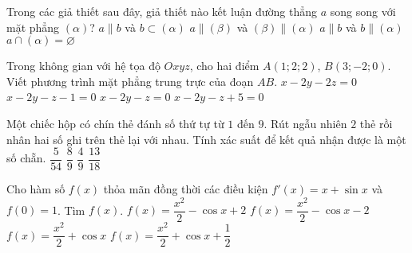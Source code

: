 \begin{ex}%
Trong các giả thiết sau đây, giả thiết nào kết luận đường thẳng $a$ song song với mặt phẳng $(\alpha)$?
\choice
{$a\parallel b$ và $b\subset (\alpha)$}
{$a\parallel (\beta)$ và $(\beta)\parallel (\alpha)$}
{$a\parallel b$ và $b\parallel (\alpha)$}
{\True $a\cap (\alpha)=\varnothing$}
\end{ex}

\begin{ex}%
Trong không gian với hệ tọa độ $Oxyz$, cho hai điểm $A(1;2;2)$, $B(3;-2;0)$. Viết phương trình mặt phẳng trung trực của đoạn $AB$.
\choice
{$x-2y-2z=0$}
{\True $x-2y-z-1=0$}
{$x-2y-z=0$}
{$x-2y-z+5=0$}
\end{ex}

\begin{ex}%
Một chiếc hộp có chín thẻ đánh số thứ tự từ $1$ đến $9$. Rút ngẫu nhiên $2$ thẻ rồi nhân hai số ghi trên thẻ lại với nhau. Tính xác suất để kết quả nhận được là một số chẵn.
\choice
{$\dfrac{5}{54}$}
{$\dfrac{8}{9}$}
{$\dfrac{4}{9}$}
{\True $\dfrac{13}{18}$}
\end{ex}

\begin{ex}%
Cho hàm số $f(x)$ thỏa mãn đồng thời các điều kiện $f'(x)=x+\sin x$ và $f(0)=1$. Tìm $f(x)$.
\choice
{\True $f(x)=\dfrac{x^2}{2}-\cos x+2$}
{$f(x)=\dfrac{x^2}{2}-\cos x-2$}
{$f(x)=\dfrac{x^2}{2}+\cos x$}
{$f(x)=\dfrac{x^2}{2}+\cos x+\dfrac{1}{2}$}
\end{ex}

